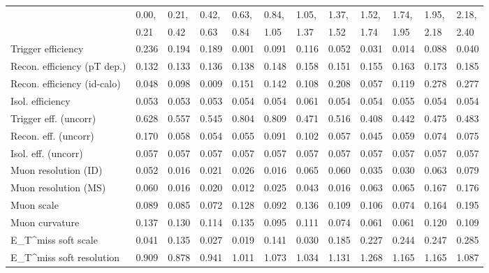 \begin{tabular}{l|p{0.6cm}p{0.6cm}p{0.6cm}p{0.6cm}p{0.6cm}p{0.6cm}p{0.6cm}p{0.6cm}p{0.6cm}p{0.6cm}p{0.6cm}}
\hline
   & 0.00, & 0.21, & 0.42, & 0.63, & 0.84, & 1.05, & 1.37, & 1.52, & 1.74, & 1.95, & 2.18,  \\ 
   & 0.21 & 0.42 & 0.63 & 0.84 & 1.05 & 1.37 & 1.52 & 1.74 & 1.95 & 2.18 & 2.40  \\ 
\hline
Trigger efficiency                       & 0.236 & 0.194 & 0.189 & 0.001 & 0.091 & 0.116 & 0.052 & 0.031 & 0.014 & 0.088 & 0.040 \\
Recon. efficiency (pT dep.)              & 0.132 & 0.133 & 0.136 & 0.138 & 0.148 & 0.158 & 0.151 & 0.155 & 0.163 & 0.173 & 0.185 \\
Recon. efficiency (id-calo)              & 0.048 & 0.098 & 0.009 & 0.151 & 0.142 & 0.108 & 0.208 & 0.057 & 0.119 & 0.278 & 0.277 \\
Isol. efficiency                         & 0.053 & 0.053 & 0.053 & 0.054 & 0.054 & 0.061 & 0.054 & 0.054 & 0.055 & 0.054 & 0.054 \\
Trigger eff. (uncorr)                    & 0.628 & 0.557 & 0.545 & 0.804 & 0.809 & 0.471 & 0.516 & 0.408 & 0.442 & 0.475 & 0.483 \\
Recon. eff. (uncorr)                     & 0.170 & 0.058 & 0.054 & 0.055 & 0.091 & 0.102 & 0.057 & 0.045 & 0.059 & 0.074 & 0.075 \\
Isol. eff. (uncorr)                      & 0.057 & 0.057 & 0.057 & 0.057 & 0.057 & 0.057 & 0.057 & 0.057 & 0.057 & 0.057 & 0.057 \\
Muon resolution (ID)                     & 0.052 & 0.016 & 0.021 & 0.026 & 0.016 & 0.065 & 0.060 & 0.035 & 0.030 & 0.063 & 0.079 \\
Muon resolution (MS)                     & 0.060 & 0.016 & 0.020 & 0.012 & 0.025 & 0.043 & 0.016 & 0.063 & 0.065 & 0.167 & 0.176 \\
Muon scale                               & 0.089 & 0.085 & 0.072 & 0.128 & 0.092 & 0.136 & 0.109 & 0.106 & 0.074 & 0.164 & 0.195 \\
Muon curvature                           & 0.137 & 0.130 & 0.114 & 0.135 & 0.095 & 0.111 & 0.074 & 0.061 & 0.061 & 0.120 & 0.109 \\
E_{T}^{miss} soft scale                  & 0.041 & 0.135 & 0.027 & 0.019 & 0.141 & 0.030 & 0.185 & 0.227 & 0.244 & 0.247 & 0.285 \\
E_{T}^{miss} soft resolution             & 0.909 & 0.878 & 0.941 & 1.011 & 1.073 & 1.034 & 1.131 & 1.268 & 1.165 & 1.165 & 1.087 \\

\end{tabular}
